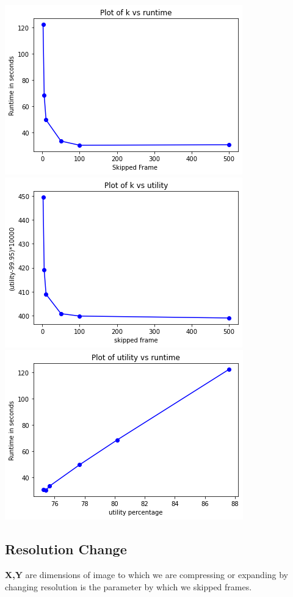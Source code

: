 \documentclass[12pt]{article}
\begin{document}
\begin{center}
\includegraphics[scale=0.9] {sub-sampling/k vs runtime.png} \\
\includegraphics[scale=0.9] {sub-sampling/k vs utility.png} \\

\includegraphics[scale=0.9] {sub-sampling/utility vs runtime.png} 
\end{center}

\subsection{Resolution Change}
\large{\textbf{X,Y} are dimensions of image to which we are compressing  or expanding  by changing resolution is the parameter by which we skipped frames.}
 
\end{document}
